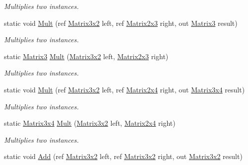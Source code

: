 \begin{DoxyCompactItemize}
\begin{DoxyCompactList}\small\item\em Multiplies two instances. \end{DoxyCompactList}\item 
static void \hyperlink{struct_open_t_k_1_1_matrix3x2_a0130b80bb76b9615fa2ee1c50617751b}{Mult} (ref \hyperlink{struct_open_t_k_1_1_matrix3x2}{Matrix3x2} left, ref \hyperlink{struct_open_t_k_1_1_matrix2x3}{Matrix2x3} right, out \hyperlink{struct_open_t_k_1_1_matrix3}{Matrix3} result)
\begin{DoxyCompactList}\small\item\em Multiplies two instances. \end{DoxyCompactList}\item 
static \hyperlink{struct_open_t_k_1_1_matrix3}{Matrix3} \hyperlink{struct_open_t_k_1_1_matrix3x2_aec340cf6e26125eda282c4440694dfe1}{Mult} (\hyperlink{struct_open_t_k_1_1_matrix3x2}{Matrix3x2} left, \hyperlink{struct_open_t_k_1_1_matrix2x3}{Matrix2x3} right)
\begin{DoxyCompactList}\small\item\em Multiplies two instances. \end{DoxyCompactList}\item 
static void \hyperlink{struct_open_t_k_1_1_matrix3x2_a0c36f9a304e48b1a82962ec73644f736}{Mult} (ref \hyperlink{struct_open_t_k_1_1_matrix3x2}{Matrix3x2} left, ref \hyperlink{struct_open_t_k_1_1_matrix2x4}{Matrix2x4} right, out \hyperlink{struct_open_t_k_1_1_matrix3x4}{Matrix3x4} result)
\begin{DoxyCompactList}\small\item\em Multiplies two instances. \end{DoxyCompactList}\item 
static \hyperlink{struct_open_t_k_1_1_matrix3x4}{Matrix3x4} \hyperlink{struct_open_t_k_1_1_matrix3x2_af9f29f7631386bf8727e2eace1b3fa32}{Mult} (\hyperlink{struct_open_t_k_1_1_matrix3x2}{Matrix3x2} left, \hyperlink{struct_open_t_k_1_1_matrix2x4}{Matrix2x4} right)
\begin{DoxyCompactList}\small\item\em Multiplies two instances. \end{DoxyCompactList}\item 
static void \hyperlink{struct_open_t_k_1_1_matrix3x2_ae17e5b35a9dc1250274f92eb50943607}{Add} (ref \hyperlink{struct_open_t_k_1_1_matrix3x2}{Matrix3x2} left, ref \hyperlink{struct_open_t_k_1_1_matrix3x2}{Matrix3x2} right, out \hyperlink{struct_open_t_k_1_1_matrix3x2}{Matrix3x2} result)

\end{DoxyCompactItemize}
